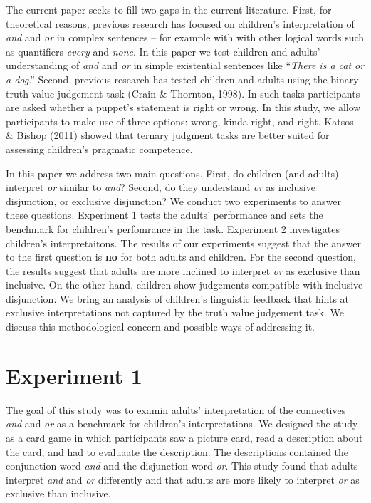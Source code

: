 \documentclass[10pt, letterpaper]{article}
\begin{document}
The current paper seeks to fill two gaps in the current literature.
First, for theoretical reasons, previous research has focused on
children's interpretation of \emph{and} and \emph{or} in complex
sentences -- for example with with other logical words such as
quantifiers \emph{every} and \emph{none}. In this paper we test children
and adults' understanding of \emph{and} and \emph{or} in simple
existential sentences like ``\emph{There is a cat or a dog}.'' Second,
previous research has tested children and adults using the binary truth
value judgement task (Crain \& Thornton, 1998). In such tasks
participants are asked whether a puppet's statement is right or wrong.
In this study, we allow participants to make use of three options:
wrong, kinda right, and right. Katsos \& Bishop (2011) showed that
ternary judgment tasks are better suited for assessing children's
pragmatic competence.

In this paper we address two main questions. First, do children (and
adults) interpret \emph{or} similar to \emph{and}? Second, do they
understand \emph{or} as inclusive disjunction, or exclusive disjunction?
We conduct two experiments to answer these questions. Experiment 1 tests
the adults' performance and sets the benchmark for children's
perfomrance in the task. Experiment 2 investigates children's
interpretaitons. The results of our experiments suggest that the answer
to the first question is \textbf{no} for both adults and children. For
the second question, the results suggest that adults are more inclined
to interpret \emph{or} as exclusive than inclusive. On the other hand,
children show judgements compatible with inclusive disjunction. We bring
an analysis of children's linguistic feedback that hints at exclusive
interpretations not captured by the truth value judgement task. We
discuss this methodological concern and possible ways of addressing it.

\section{Experiment 1}\label{experiment-1}

The goal of this study was to examin adults' interpretation of the
connectives \emph{and} and \emph{or} as a benchmark for children's
interpretations. We designed the study as a card game in which
participants saw a picture card, read a description about the card, and
had to evaluaate the description. The descriptions contained the
conjunction word \emph{and} and the disjunction word \emph{or}. This
study found that adults interpret \emph{and} and \emph{or} differently
and that adults are more likely to interpret \emph{or} as exclusive than
inclusive.
\end{document}
